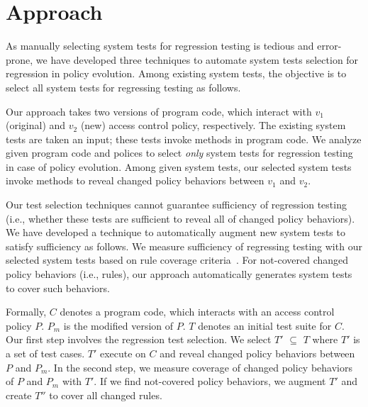 \section{Approach}
\label{sec:approach}
As manually selecting system tests for regression testing is tedious and error-prone, we have developed three techniques to automate 
system tests selection for regression in policy evolution. Among existing system tests, the objective is to select 
all system tests for regressing testing as follows.

Our approach takes two versions of program code, which interact with $v_1$ (original) and $v_2$ (new) access control policy, 
respectively. The existing system tests are taken an input; these tests invoke methods in program code.
We analyze given program code and polices to select \emph{only} system tests for regression testing in case of policy evolution. 
Among given system tests, our selected system tests invoke methods to reveal changed policy behaviors between $v_1$ and $v_2$.

Our test selection techniques cannot guarantee sufficiency of regression 
testing (i.e., whether these tests are sufficient to reveal all of changed policy behaviors). We have developed a technique to 
automatically augment new system tests to satisfy sufficiency as follows. We measure sufficiency of regressing testing with our 
selected system tests based on rule coverage criteria~\cite{}. For not-covered changed policy behaviors (i.e., rules), 
our approach automatically generates system tests to cover such behaviors.

Formally, $C$ denotes a program code, which interacts with an access control policy $P$. $P_{m}$ is the modified version of $P$. 
$T$ denotes an initial test suite for $C$. Our first step involves the regression test 
selection. We select $T'$ $\subseteq$ $T$ where $T'$ is a set of test cases. $T'$ execute on $C$ and reveal changed policy 
behaviors between $P$ and $P_{m}$. In the second step, we measure coverage of changed policy behaviors of $P$ and $P_{m}$ with $T'$. 
If we find not-covered policy behaviors, we augment $T'$ and create $T''$ to cover all changed rules. 

